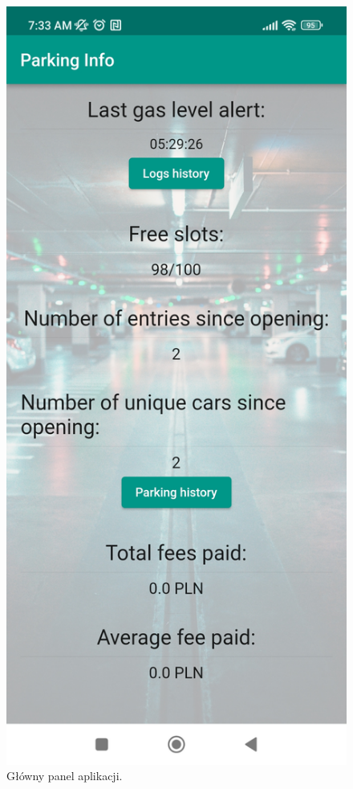\documentclass[a4paper, 11pt]{article}
\begin{document}
\begin{figure}[H]
\begin{center}
\includegraphics[width=0.6\linewidth]{panel.jpg}
\caption{Główny panel aplikacji.}
\end{center}
\end{figure}
\end{document}
